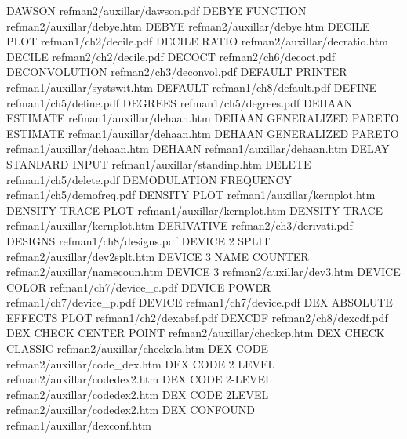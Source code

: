 DAWSON                                  refman2/auxillar/dawson.pdf
DEBYE FUNCTION                          refman2/auxillar/debye.htm
DEBYE                                   refman2/auxillar/debye.htm
DECILE PLOT                             refman1/ch2/decile.pdf
DECILE RATIO                            refman2/auxillar/decratio.htm
DECILE                                  refman2/ch2/decile.pdf
DECOCT                                  refman2/ch6/decoct.pdf
DECONVOLUTION                           refman2/ch3/deconvol.pdf
DEFAULT PRINTER                         refman1/auxillar/systswit.htm
DEFAULT                                 refman1/ch8/default.pdf
DEFINE                                  refman1/ch5/define.pdf
DEGREES                                 refman1/ch5/degrees.pdf
DEHAAN ESTIMATE                         refman1/auxillar/dehaan.htm
DEHAAN GENERALIZED PARETO  ESTIMATE     refman1/auxillar/dehaan.htm
DEHAAN GENERALIZED PARETO               refman1/auxillar/dehaan.htm
DEHAAN                                  refman1/auxillar/dehaan.htm
DELAY STANDARD INPUT                    refman1/auxillar/standinp.htm
DELETE                                  refman1/ch5/delete.pdf
DEMODULATION FREQUENCY                  refman1/ch5/demofreq.pdf
DENSITY PLOT                            refman1/auxillar/kernplot.htm
DENSITY TRACE PLOT                      refman1/auxillar/kernplot.htm
DENSITY TRACE                           refman1/auxillar/kernplot.htm
DERIVATIVE                              refman2/ch3/derivati.pdf
DESIGNS                                 refman1/ch8/designs.pdf
DEVICE 2 SPLIT                          refman2/auxillar/dev2splt.htm
DEVICE 3 NAME COUNTER                   refman2/auxillar/namecoun.htm
DEVICE 3                                refman2/auxillar/dev3.htm
DEVICE COLOR                            refman1/ch7/device_c.pdf
DEVICE POWER                            refman1/ch7/device_p.pdf
DEVICE                                  refman1/ch7/device.pdf
DEX ABSOLUTE EFFECTS PLOT               refman1/ch2/dexabef.pdf
DEXCDF                                  refman2/ch8/dexcdf.pdf
DEX CHECK CENTER POINT                  refman2/auxillar/checkcp.htm
DEX CHECK CLASSIC                       refman2/auxillar/checkcla.htm
DEX CODE                                refman2/auxillar/code_dex.htm
DEX CODE 2 LEVEL                        refman2/auxillar/codedex2.htm
DEX CODE 2-LEVEL                        refman2/auxillar/codedex2.htm
DEX CODE 2LEVEL                         refman2/auxillar/codedex2.htm
DEX CONFOUND                            refman1/auxillar/dexconf.htm
